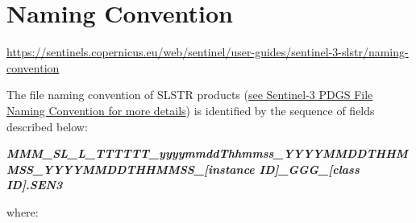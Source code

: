 \documentclass[sigplan,screen]{acmart}
\begin{document}



\section{Naming Convention}

\url{https://sentinels.copernicus.eu/web/sentinel/user-guides/sentinel-3-slstr/naming-convention}

The file naming convention of SLSTR products
(\href{https://earth.esa.int/documents/247904/1964331/Sentinel-3_PDGS_File_Naming_Convention}{see
Sentinel-3 PDGS File Naming Convention for more details}) is identified
by the sequence of fields described below:

\emph{\textbf{MMM\_SL\_L\_TTTTTT\_yyyymmddThhmmss\_YYYYMMDDTHHMMSS\_YYYYMMDDTHHMMSS\_{[}instance
ID{]}\_GGG\_{[}class ID{]}.SEN3}}

where:
\end{document}

